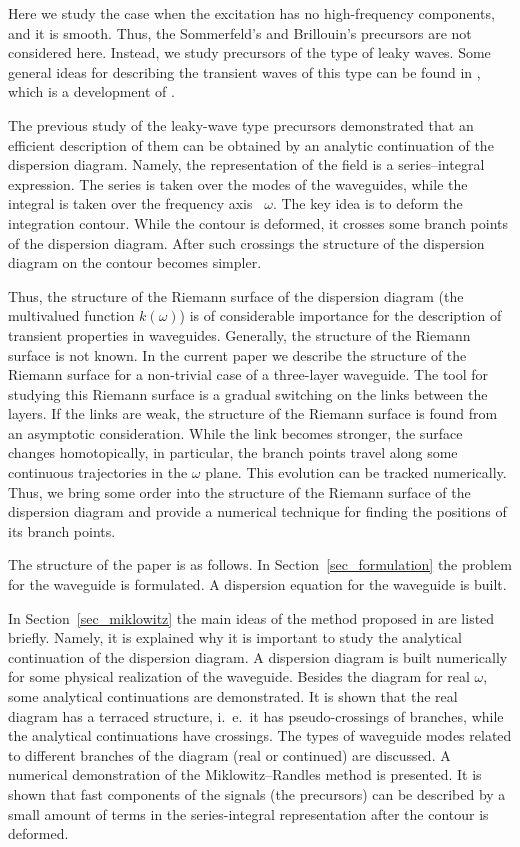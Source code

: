 \documentclass[12pt]{article}
\begin{document}
Here we study the case when the excitation has no high-frequency components, and it is 
smooth. Thus, the Sommerfeld's and Brillouin's precursors are not considered here. Instead, 
we study precursors of the type of leaky waves. Some general ideas for describing the transient waves of this type can be found in \cite{Shanin},
which is a development of \cite{Miklowitz}.   

The previous study of the leaky-wave type precursors demonstrated that an efficient description of them can be obtained by an analytic continuation of the dispersion diagram. Namely, the representation of the field is a series--integral expression. The series is
taken over the modes of the waveguides, while the integral is taken over the frequency axis ~$\omega$. The key idea is to deform the integration contour. While the contour is deformed, 
it crosses some branch points of the dispersion diagram. After such crossings the structure of the dispersion diagram on the contour becomes simpler. 

Thus, the structure of the Riemann surface of the dispersion diagram (the multivalued function $k(\omega)$) is of considerable importance for the description of transient properties in waveguides. Generally, the structure of the Riemann surface is not known. 
In the current paper we describe the structure of the Riemann surface for a non-trivial case 
of a three-layer waveguide. The tool for studying this Riemann surface is a gradual 
switching on the links between the layers. If the links are weak, the structure of the Riemann surface is found from an asymptotic consideration. While the link becomes stronger, 
the surface changes homotopically, in particular, the branch points travel along some 
continuous trajectories in the $\omega$ plane. This evolution can be tracked numerically. Thus, 
we bring some order into the structure of the Riemann surface of the dispersion diagram and
provide a numerical technique for finding the positions of its branch points.     

The structure of the paper is as follows. In Section~\ref{sec_formulation} the problem for the 
waveguide is formulated. A dispersion equation for the waveguide is 
built. 

In Section~\ref{sec_miklowitz} the main ideas of the method proposed in 
\cite{Miklowitz,Randles,Shanin} are listed briefly. Namely, it is explained why it is important to study the 
analytical continuation of the dispersion diagram.  
A dispersion diagram is built numerically for some physical realization of the waveguide.
Besides the diagram for real $\omega$, some analytical continuations are demonstrated. 
It is shown that the real diagram has a terraced structure, i.~e.\ it has pseudo-crossings 
of branches, while the analytical continuations have crossings. The types of waveguide modes 
related to different branches of the diagram (real or continued) are discussed. 
A numerical demonstration of the Miklowitz--Randles method 
is presented. It is shown that fast components of the signals (the precursors) can be described by 
a small amount of terms in the series-integral representation after the contour is deformed. 
\end{document}

